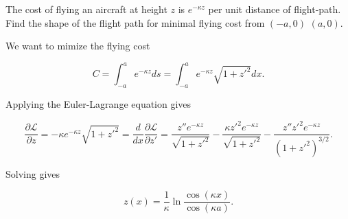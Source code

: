 \documentclass[a4paper,12pt]{report}
\begin{document}
{The cost of flying an aircraft at height \(z\) is \(e^{-\kappa z} \) per unit distance of flight-path. Find the shape of the flight path for minimal flying cost from \((-a,0) \) \((a,0)\).   }
{We want to mimize the flying cost 

\begin{equation}
	C = \int_{-a}^{a} e^{-\kappa z} ds = \int_{-a}^{a} e^{-\kappa z} \sqrt{1+z'^2} dx.
\end{equation}

Applying the Euler-Lagrange equation gives 

\begin{equation}
	\frac{\partial \mathcal{L}}{\partial z} = -\kappa e^{-\kappa z}\sqrt{1+z'^2} = \frac{d}{dx} \frac{\partial \mathcal{L}}{\partial z'}= \frac{z''e^{-\kappa z} }{\sqrt{1+z'^2} } - \frac{\kappa z'^2e^{-\kappa z} }{\sqrt{1+z'^2} } - \frac{z''z'^2e^{-\kappa z} }{(1+z'^2)^{3 /2} }.      
\end{equation}

Solving gives 

\begin{equation}
	z(x) = \frac{1}{\kappa } \ln \frac{\cos (\kappa x)}{\cos (\kappa a)}.  
\end{equation}~
} 
\end{document}
